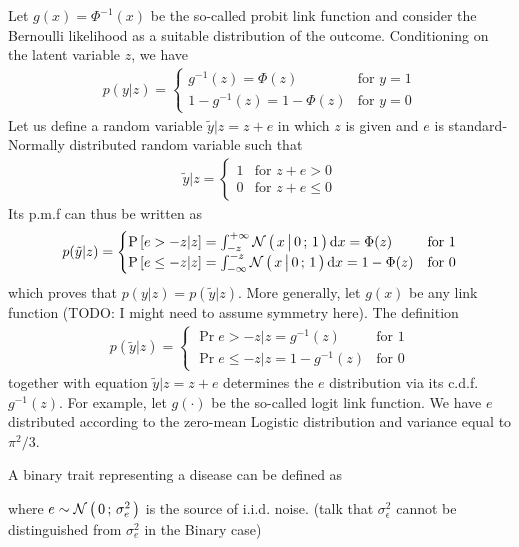 Let $g(x) = \Phi^{-1}(x)$ be the so-called probit link function and consider the
Bernoulli likelihood as a suitable distribution of the outcome. Conditioning on
the latent variable $z$, we have
\begin{align*}
  p(y|z) = \begin{cases}
  g^{-1}(z) = \Phi(z) & \text{for } y = 1\\
  1-g^{-1}(z) = 1-\Phi(z) & \text{for } y = 0
  \end{cases}
\end{align*}
Let us define a random variable $\tilde y | z = z + e$ in which $z$ is given and
$e$ is standard-Normally distributed random variable such that
\begin{align*}
  \tilde y | z = \begin{cases}
  1 & \text{for } z + e > 0\\
  0 & \text{for } z + e \leq 0
  \end{cases}
\end{align*}
Its p.m.f can thus be written as
\begin{align*}
  p(\tilde y | z) = \begin{cases}
  \text{P}\left[ {e > -z | z} \right] = \int_{-z}^{+\infty} \mathcal{N}\left(\, { {x} \, \big| \, {0} } \,;\, { {1} } \,\right) \mathrm d x = \Phi(z)  & \text{for } 1\\
  \text{P}\left[ {e \leq -z | z} \right] = \int_{-\infty}^{-z} \mathcal{N}\left(\, { {x} \, \big| \, {0} } \,;\, { {1} } \,\right) \mathrm d x = 1-\Phi(z) & \text{for } 0
  \end{cases}
\end{align*}
which proves that $p(y|z) = p(\tilde y|z)$. More generally, let $g(x)$ be any
link function (TODO: I might need to assume symmetry here). The definition
\begin{align*}
  p(\tilde y | z) = \begin{cases}
  \Pr{e > -z | z} = g^{-1}(z)  & \text{for } 1\\
  \Pr{e \leq -z | z} = 1-g^{-1}(z) & \text{for } 0
  \end{cases}
\end{align*}
together with equation $\tilde y | z = z + e$ determines the $e$ distribution
via its c.d.f. $g^{-1}(z)$. For example, let $g(\cdot)$ be the so-called logit
link function. We have $e$ distributed according to the zero-mean Logistic
distribution and variance equal to $\pi^2/3$.



A binary trait representing a disease can be defined as

where $e \sim \mathcal{N}\left(\, {0} \,;\, {\sigma_e^2} \,\right)$ is the source of i.i.d. noise. (talk that
$\sigma_{\epsilon}^2$ cannot be distinguished from $\sigma_e^2$ in the Binary
case)


